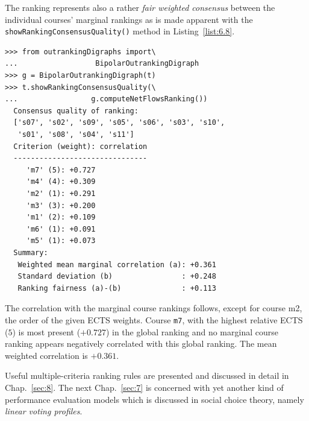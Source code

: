 The \NetFlows ranking represents also a rather \emph{fair weighted consensus} between the individual courses' marginal rankings as is made apparent with the \texttt{showRankingConsensusQuality()} method in Listing~\vref{list:6.8}.
\begin{lstlisting}[caption={Consensus quality of the students's ranking},label=list:6.8]
>>> from outrankingDigraphs import\
...                  BipolarOutrankingDigraph
>>> g = BipolarOutrankingDigraph(t)
>>> t.showRankingConsensusQuality(\
...                 g.computeNetFlowsRanking())
  Consensus quality of ranking:
  ['s07', 's02', 's09', 's05', 's06', 's03', 's10',
   's01', 's08', 's04', 's11']
  Criterion (weight): correlation
  -------------------------------
     'm7' (5): +0.727
     'm4' (4): +0.309
     'm2' (1): +0.291
     'm3' (3): +0.200
     'm1' (2): +0.109
     'm6' (1): +0.091
     'm5' (1): +0.073
  Summary:
   Weighted mean marginal correlation (a): +0.361
   Standard deviation (b)                : +0.248
   Ranking fairness (a)-(b)              : +0.113
\end{lstlisting}

The correlation with the marginal course rankings follows, except for course m2,  the order of the given ECTS weights. Course \texttt{m7}, with the highest relative ECTS ($5$) is most present ($+0.727$) in the global \NetFlows ranking and no marginal course ranking appears negatively correlated with this global ranking. The mean weighted correlation is $+0.361$.

\vspace{\baselineskip}
Useful multiple-criteria ranking rules are presented and discussed in detail in Chap.~\ref{sec:8}. The next Chap.~\ref{sec:7} is concerned with yet another kind of performance evaluation models which is discussed in social choice theory, namely \emph{linear voting profiles}.

 
%
%

